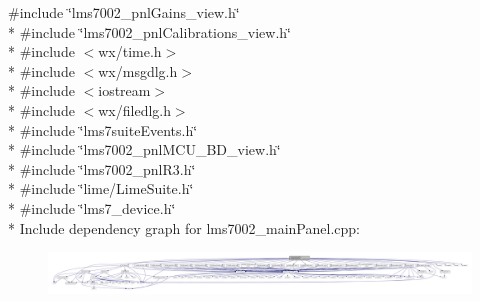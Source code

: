 {\ttfamily \#include \char`\"{}lms7002\+\_\+pnl\+Gains\+\_\+view.\+h\char`\"{}}\\*
{\ttfamily \#include \char`\"{}lms7002\+\_\+pnl\+Calibrations\+\_\+view.\+h\char`\"{}}\\*
{\ttfamily \#include $<$wx/time.\+h$>$}\\*
{\ttfamily \#include $<$wx/msgdlg.\+h$>$}\\*
{\ttfamily \#include $<$iostream$>$}\\*
{\ttfamily \#include $<$wx/filedlg.\+h$>$}\\*
{\ttfamily \#include \char`\"{}lms7suite\+Events.\+h\char`\"{}}\\*
{\ttfamily \#include \char`\"{}lms7002\+\_\+pnl\+M\+C\+U\+\_\+\+B\+D\+\_\+view.\+h\char`\"{}}\\*
{\ttfamily \#include \char`\"{}lms7002\+\_\+pnl\+R3.\+h\char`\"{}}\\*
{\ttfamily \#include \char`\"{}lime/\+Lime\+Suite.\+h\char`\"{}}\\*
{\ttfamily \#include \char`\"{}lms7\+\_\+device.\+h\char`\"{}}\\*
Include dependency graph for lms7002\+\_\+main\+Panel.\+cpp\+:
\nopagebreak
\begin{figure}[H]
\begin{center}
\leavevmode
\includegraphics[width=350pt]{d9/d78/lms7002__mainPanel_8cpp__incl}
\end{center}
\end{figure}
